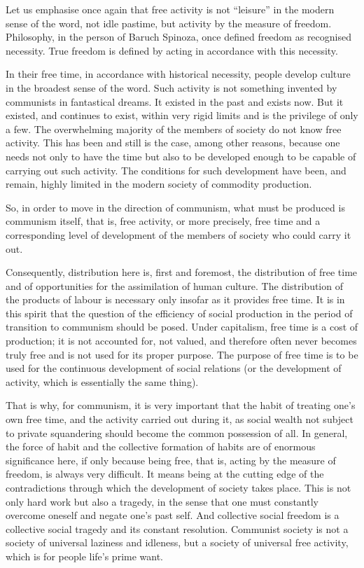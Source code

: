 \documentclass[12pt,a4paper,openany]{book}
\begin{document}
Let us emphasise once again that free activity is not “leisure” in the modern sense of the word, not idle pastime, but activity by the measure of freedom. Philosophy, in the person of Baruch Spinoza, once defined freedom as recognised necessity. True freedom is defined by acting in accordance with this necessity.

In their free time, in accordance with historical necessity, people develop culture in the broadest sense of the word. Such activity is not something invented by communists in fantastical dreams. It existed in the past and exists now. But it existed, and continues to exist, within very rigid limits and is the privilege of only a few. The overwhelming majority of the members of society do not know free activity. This has been and still is the case, among other reasons, because one needs not only to have the time but also to be developed enough to be capable of carrying out such activity. The conditions for such development have been, and remain, highly limited in the modern society of commodity production.

So, in order to move in the direction of communism, what must be produced is communism itself, that is, free activity, or more precisely, free time and a corresponding level of development of the members of society who could carry it out.

Consequently, distribution here is, first and foremost, the distribution of free time and of opportunities for the assimilation of human culture. The distribution of the products of labour is necessary only insofar as it provides free time. It is in this spirit that the question of the efficiency of social production in the period of transition to communism should be posed. Under capitalism, free time is a cost of production; it is not accounted for, not valued, and therefore often never becomes truly free and is not used for its proper purpose. The purpose of free time is to be used for the continuous development of social relations (or the development of activity, which is essentially the same thing).

That is why, for communism, it is very important that the habit of treating one's own free time, and the activity carried out during it, as social wealth not subject to private squandering should become the common possession of all. In general, the force of habit and the collective formation of habits are of enormous significance here, if only because being free, that is, acting by the measure of freedom, is always very difficult. It means being at the cutting edge of the contradictions through which the development of society takes place. This is not only hard work but also a tragedy, in the sense that one must constantly overcome oneself and negate one's past self. And collective social freedom is a collective social tragedy and its constant resolution. Communist society is not a society of universal laziness and idleness, but a society of universal free activity, which is for people life’s prime want.
\end{document}
